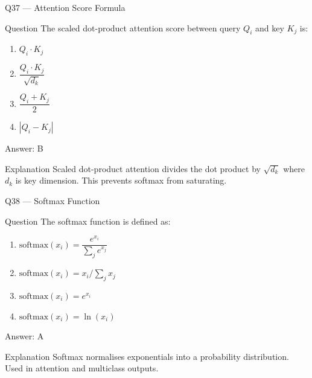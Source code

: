 \documentclass[aspectratio=169,8pt]{beamer}
\begin{document}
	\begin{frame}{Q37 --- Attention Score Formula}
		\begin{block}{Question}
			The scaled dot-product attention score between query $Q_i$ and key $K_j$ is:
			\begin{enumerate}
				\item $Q_i \cdot K_j$
				\item $\dfrac{Q_i \cdot K_j}{\sqrt{d_k}}$
				\item $\dfrac{Q_i + K_j}{2}$
				\item $|Q_i - K_j|$
			\end{enumerate}
		\end{block}
		\begin{exampleblock}{Answer: B}\end{exampleblock}
		\begin{block}{Explanation}
			Scaled dot-product attention divides the dot product by $\sqrt{d_k}$ where $d_k$ is key dimension. This prevents softmax from saturating.
		\end{block}
	\end{frame}
	
	\begin{frame}{Q38 --- Softmax Function}
		\begin{block}{Question}
			The softmax function is defined as:
			\begin{enumerate}
				\item $\text{softmax}(x_i) = \dfrac{e^{x_i}}{\sum_j e^{x_j}}$
				\item $\text{softmax}(x_i) = x_i / \sum_j x_j$
				\item $\text{softmax}(x_i) = e^{x_i}$
				\item $\text{softmax}(x_i) = \ln(x_i)$
			\end{enumerate}
		\end{block}
		\begin{exampleblock}{Answer: A}\end{exampleblock}
		\begin{block}{Explanation}
			Softmax normalises exponentials into a probability distribution. Used in attention and multiclass outputs.
		\end{block}
	\end{frame}
	
\end{document}
